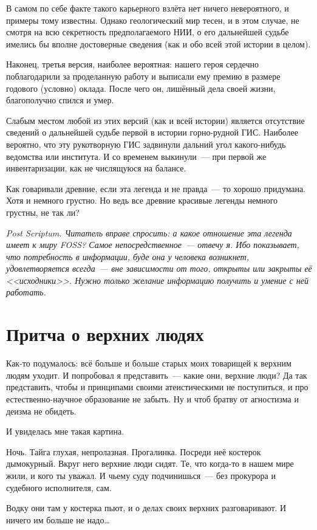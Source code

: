 В самом по себе факте такого карьерного взлёта нет ничего невероятного, и примеры тому известны. Однако геологический мир тесен, и в этом случае, не смотря на всю секретность предполагаемого НИИ, о его дальнейшей судьбе имелись бы вполне достоверные сведения (как и обо всей этой истории в целом).

Наконец, третья версия, наиболее вероятная: нашего героя сердечно поблагодарили за проделанную работу и выписали ему премию в размере годового (условно) оклада. После чего он, лишённый дела своей жизни, благополучно спился и умер.

Слабым местом любой из этих версий (как и всей истории) является отсутствие сведений о дальнейшей судьбе первой в истории горно-рудной ГИС. Наиболее вероятно, что эту рукотворную ГИС задвинули дальний угол какого-нибудь ведомства или института. И со временем выкинули~--- при первой же инвентаризации, как не числящуюся на балансе.

Как говаривали древние, если эта легенда и не правда~--- то хорошо придумана. Хотя и немного грустно. Но ведь все древние красивые легенды немного грустны, не так ли?

\textsl{Post Scriptum. Читатель вправе спросить: а какое отношение эта легенда имеет к миру FOSS? Самое непосредственное~--- отвечу я. Ибо показывает, что потребность в информации, буде она у человека возникнет, удовлетворяется всегда~--- вне зависимости от того, открыты или закрыты её <<исходники>>. Нужно только желание информацию получить и умение с ней работать.}


\section{Притча о верхних людях} 

Как-то подумалось: всё больше и больше старых моих товарищей к верхним людям уходит. И попробовал я представить~--- какие они, верхние люди? Да так представить, чтобы и принципами своими атеистическими не поступиться, и про естественно-научное образование не забыть. Ну и чтоб братву от агностизма и деизма не обидеть.

И увиделась мне такая картина.

Ночь. Тайга глухая, непролазная. Прогалинка. Посреди неё костерок дымокурный. Вкруг него верхние люди сидят. Те, что когда-то в нашем мире жили, и кого ты уважал. И чьему суду подчинишься~--- без прокурора и судебного исполнителя, сам.

Водку они там у костерка пьют, и о делах своих верхних разговаривают. И ничего им больше не надо\dots

